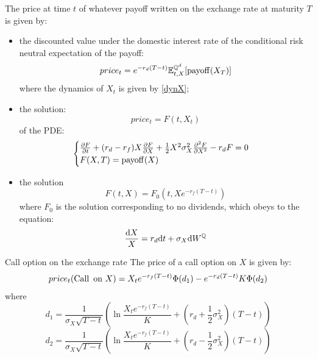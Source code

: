 \begin{proposition}
    The price at time $t$ of whatever payoff written on the exchange rate at maturity $T$ is given by:
    \begin{itemize}
    \item the discounted value under the domestic interest rate of the conditional risk neutral expectation of the payoff:
    \begin{equation}
    price_t = e^{-r_d(T-t)}\mathbb{E}^{\mathbb{Q}^d}_{t,X}[\operatorname{payoff}(X_T)]
    \end{equation}
    where the dynamics of $X_t$ is given by \eqref{dynX};
    \item the solution:
    \begin{equation}
        price_t = F(t,X_t)
    \end{equation}
    of the PDE:
    \begin{equation}
        \begin{cases}
        \pdv{F}{t} + (r_d-r_f)X\pdv{F}{X} + \frac{1}{2}X^2\sigma_X^2\pdv[2]{F}{X} - r_dF = 0\\
        F(X,T) = \operatorname{payoff}(X)
        \end{cases}
    \end{equation}
    \item the solution \begin{equation}
        F(t,X) = F_0(t,Xe^{-r_f(T-t)})
    \end{equation}
    where $F_0$ is the solution corresponding to no dividends, which obeys to the equation:
    \begin{equation}
        \frac{\dd X}{X} = r_d\dd t + \sigma_X\dd W^{\mathbb{Q}}
    \end{equation}
    \end{itemize}
\end{proposition}
\begin{example}{Call option on the exchange rate}{}{}
    The price of a call option on $X$ is given by:
   \begin{align}
       price_t(\operatorname{Call}\text{ on } X) = X_t e^{-r_f(T-t)}\Phi(d_1) - e^{-r_d(T-t)}K\Phi(d_2)
   \end{align}
   where
   \begin{equation}
       d_1 = \frac{1}{\sigma_X\sqrt{T-t}}\left(\ln\frac{X_te^{-r_f(T-t)}}{K}+\left(r_d+\frac{1}{2}\sigma_X^2\right)(T-t)\right)
   \end{equation}
   \begin{equation}
       d_2 = \frac{1}{\sigma_X\sqrt{T-t}}\left(\ln\frac{X_te^{-r_f(T-t)}}{K}+\left(r_d-\frac{1}{2}\sigma_X^2\right)(T-t)\right)
   \end{equation}
\end{example}
